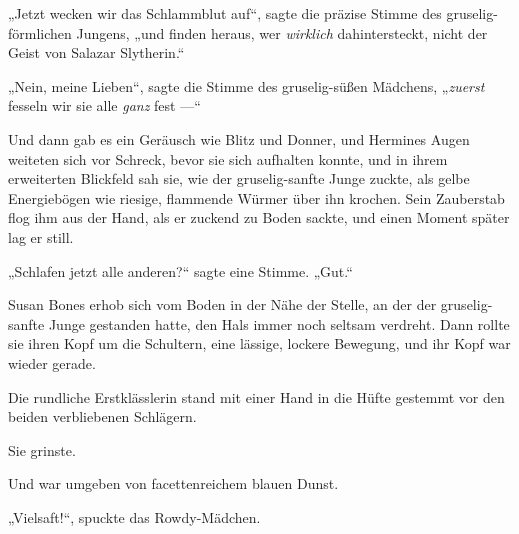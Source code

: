„Jetzt wecken wir das Schlammblut auf“, sagte die präzise Stimme des gruselig-förmlichen Jungens, „und finden heraus, wer \emph{wirklich} dahintersteckt, nicht der Geist von Salazar Slytherin.“

„Nein, meine Lieben“, sagte die Stimme des gruselig-süßen Mädchens,
„\emph{zuerst} fesseln wir sie alle \emph{ganz} fest —“

Und dann gab es ein Geräusch wie Blitz und Donner, und Hermines Augen weiteten sich vor Schreck, bevor sie sich aufhalten konnte, und in ihrem erweiterten Blickfeld sah sie, wie der gruselig-sanfte Junge zuckte, als gelbe Energiebögen wie riesige, flammende Würmer über ihn krochen. Sein Zauberstab flog ihm aus der Hand, als er zuckend zu Boden sackte, und einen Moment später lag er still.

„Schlafen jetzt alle anderen?“ sagte eine Stimme.
„Gut.“

Susan Bones erhob sich vom Boden in der Nähe der Stelle, an der der gruselig-sanfte Junge gestanden hatte, den Hals immer noch seltsam verdreht. Dann rollte sie ihren Kopf um die Schultern, eine lässige, lockere Bewegung, und ihr Kopf war wieder gerade.

Die rundliche Erstklässlerin stand mit einer Hand in die Hüfte gestemmt vor den beiden verbliebenen Schlägern.

Sie grinste.

Und war umgeben von facettenreichem blauen Dunst.

„Vielsaft!“, spuckte das Rowdy-Mädchen.


